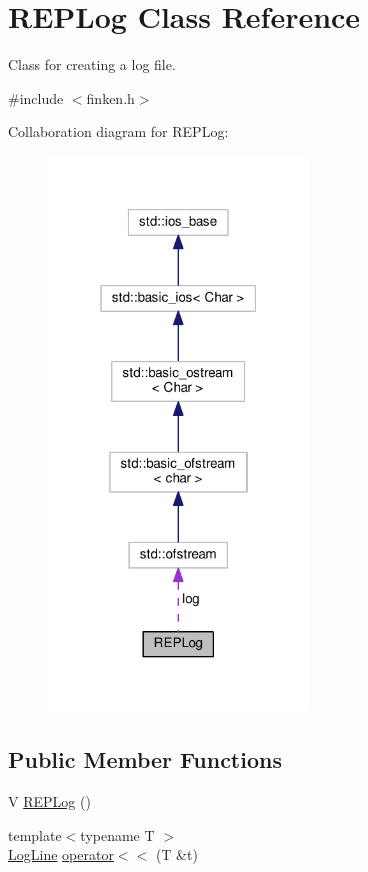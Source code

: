 \hypertarget{classREPLog}{}\section{R\+E\+P\+Log Class Reference}
\label{classREPLog}


Class for creating a log file.  




{\ttfamily \#include $<$finken.\+h$>$}



Collaboration diagram for R\+E\+P\+Log\+:
\nopagebreak
\begin{figure}[H]
\begin{center}
\leavevmode
\includegraphics[width=196pt]{classREPLog__coll__graph}
\end{center}
\end{figure}
\subsection*{Public Member Functions}
\begin{DoxyCompactItemize}
\item 
V \hyperlink{classREPLog_a11fd89c87f4185f23f8c3b6350935650}{R\+E\+P\+Log} ()
\item 
{\footnotesize template$<$typename T $>$ }\\\hyperlink{classLogLine}{Log\+Line} \hyperlink{classREPLog_af79be1a4cfefdf892cdc987cc0518145}{operator$<$$<$} (T \&t)
\end{DoxyCompactItemize}
